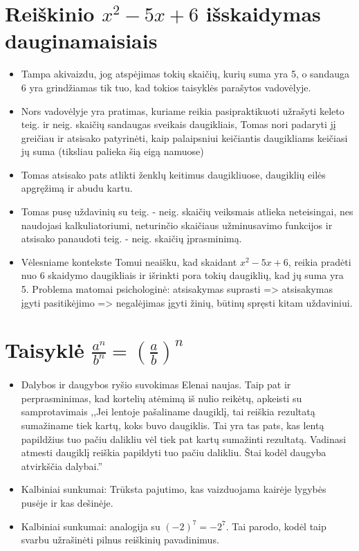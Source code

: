 \documentclass[a4paper,png]{article}
\begin{document}
\section{Reiškinio $x^2-5x+6$ išskaidymas dauginamaisiais}
\begin{itemize}
\item Tampa akivaizdu, jog atspėjimas tokių skaičių, kurių suma yra 5, o sandauga 6 yra grindžiamas tik tuo, kad tokios taisyklės parašytos vadovėlyje.
\item Nors vadovėlyje yra pratimas, kuriame reikia pasipraktikuoti užrašyti keleto teig. ir neig. skaičių sandaugas sveikais daugikliais, Tomas nori padaryti jį greičiau ir atsisako patyrinėti, kaip palaipsniui keičiantis daugikliams keičiasi jų suma (tiksliau palieka šią eigą namuose)
\item Tomas atsisako pats atlikti ženklų keitimus daugikliuose, daugiklių eilės apgręžimą ir abudu kartu.
\item Tomas pusę uždavinių su teig. - neig. skaičių veiksmais atlieka neteisingai, nes naudojasi kalkuliatoriumi, neturinčio skaičiaus užminusavimo funkcijos ir atsisako panaudoti teig. - neig. skaičių įprasminimą.
\item Vėlesniame kontekste Tomui neaišku, kad skaidant $x^2-5x+6$, reikia pradėti nuo 6 skaidymo daugikliais ir išrinkti pora tokių daugiklių, kad jų suma yra 5.  Problema matomai psichologinė: atsisakymas suprasti => atsisakymas įgyti pasitikėjimo => negalėjimas įgyti žinių, būtinų spręsti kitam uždaviniui.
\end{itemize}
\section{Taisyklė $\frac{a^n}{b^n}=\left(\frac{a}{b}\right)^n$}
\begin{itemize}
\item Dalybos ir daugybos ryšio suvokimas Elenai naujas. Taip pat ir perprasminimas, kad kortelių atėmimą iš nulio reikėtų, apkeisti su samprotavimais  ,,Jei lentoje pašaliname daugiklį, tai reiškia rezultatą sumažiname tiek kartų, koks buvo daugiklis. Tai yra tas pats, kas lentą papildžius tuo pačiu dalikliu vėl tiek pat kartų sumažinti rezultatą. Vadinasi atmesti daugiklį reiškia papildyti tuo pačiu dalikliu. Štai kodėl daugyba atvirkščia dalybai.''
\item Kalbiniai sunkumai: Trūksta pajutimo, kas vaizduojama kairėje lygybės pusėje ir kas dešinėje.
\item Kalbiniai sunkumai: analogija su $(-2)^7=-2^7$. Tai parodo, kodėl taip svarbu užrašinėti pilnus reiškinių pavadinimus. 
\end{itemize}
\end{document}
